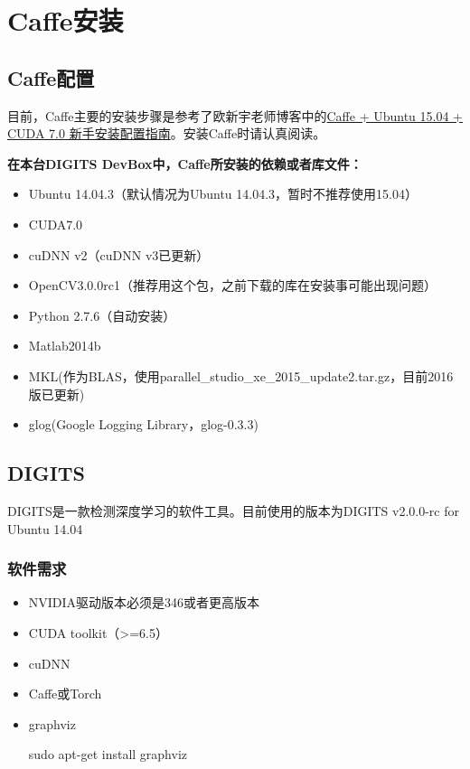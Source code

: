 \section{Caffe安装}
\subsection{Caffe配置}
目前，Caffe主要的安装步骤是参考了欧新宇老师博客中的\href{http://ouxinyu.github.io/Blogs/20140723001.html}{Caffe + Ubuntu 15.04 + CUDA 7.0 新手安装配置指南}。安装Caffe时请认真阅读。

\textbf{在本台DIGITS DevBox中，Caffe所安装的依赖或者库文件：}
\begin{itemize}
\item Ubuntu 14.04.3（默认情况为Ubuntu 14.04.3，暂时不推荐使用15.04）
\item CUDA7.0
\item cuDNN v2（cuDNN v3已更新）
\item OpenCV3.0.0rc1（推荐用这个包，之前下载的库在安装事可能出现问题）
\item Python 2.7.6（自动安装）
\item Matlab2014b
\item MKL(作为BLAS，使用parallel\_studio\_xe\_2015\_update2.tar.gz，目前2016版已更新)
\item glog(Google Logging Library，glog-0.3.3)
\end{itemize}

\subsection{DIGITS}
DIGITS是一款检测深度学习的软件工具。目前使用的版本为DIGITS v2.0.0-rc for Ubuntu 14.04
\subsubsection{软件需求}
\begin{itemize}
\item NVIDIA驱动版本必须是346或者更高版本
\item CUDA toolkit（>=6.5）
\item cuDNN
\item Caffe或Torch
\item graphviz
\begin{bash}
sudo apt-get install graphviz
\end{bash}
\end{itemize}

